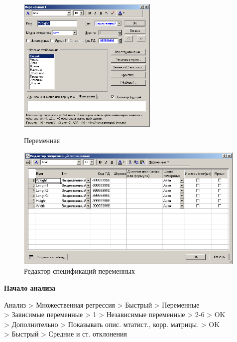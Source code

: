\begin{figure}[!h]
  \centering
  \begin{minipage}{0.49\textwidth}
    \centering

    \includegraphics[height=6.5cm]
    {inc/var5__2.PNG}

    \caption{Переменная}
    \label{fig:var5__2}
  \end{minipage}
  \begin{minipage}{0.49\textwidth}
    \centering

    \includegraphics[width=0.99\textwidth]
    {inc/var5__3.PNG}

    \caption{Редактор спецификаций переменных}
    \label{fig:var5__3}
  \end{minipage}
\end{figure}

\newpage

\begin{center}
  \textbf{Начало анализа}
\end{center}

Анализ > Множественная регрессия > Быстрый > Переменные\\
> Зависимые переменные > 1 > Независимые переменные > 2-6 > OK\\
> Дополнительно > Показывать опис. мтатист., корр. матрицы. > OK\\
> Быстрый > Средние и ст. отклонения

